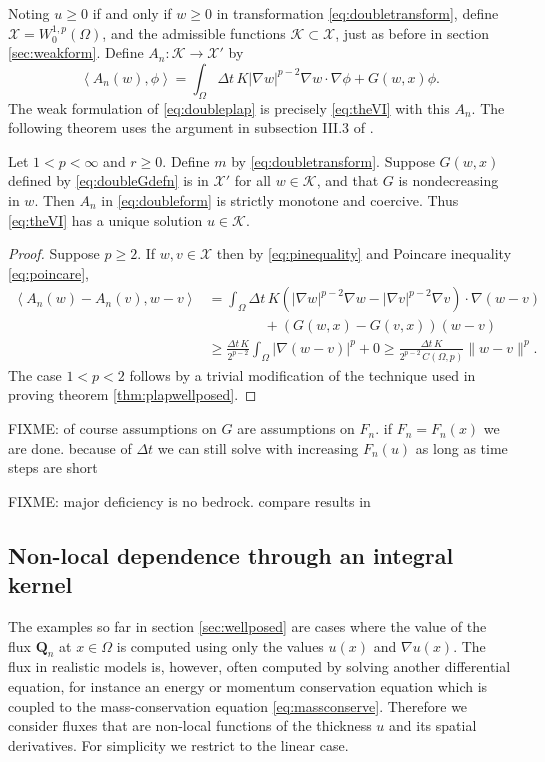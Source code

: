 \documentclass[final,leqno,onefignum,onetabnum]{siamltex1213bueler}
\newcommand\bQ{\mathbf{Q}}
\renewcommand{\grad}{\nabla}
\newcommand{\ip}[2]{\ensuremath{\left<#1,#2\right>}}
\begin{document}
Noting $u\ge 0$ if and only if $w\ge 0$ in transformation \eqref{eq:doubletransform}, define $\mathcal{X} = W_0^{1,p}(\Omega)$, and the admissible functions $\mathcal{K}\subset \mathcal{X}$, just as before in section \ref{sec:weakform}.  Define $A_n: \mathcal{K} \to \mathcal{X}'$ by
\begin{equation}
\ip{A_n(w)}{\phi} = \int_\Omega \Delta t\, K |\grad w|^{p-2} \grad w\cdot \grad \phi + G(w,x)\phi. \label{eq:doubleform}
\end{equation}
The weak formulation of \eqref{eq:doubleplap} is precisely \eqref{eq:theVI} with this $A_n$.  The following theorem uses the argument in subsection III.3 of \cite{KinderlehrerStampacchia1980}.

\medskip
\begin{theorem}
Let $1<p<\infty$ and $r\ge 0$.  Define $m$ by \eqref{eq:doubletransform}.  Suppose $G(w,x)$ defined by \eqref{eq:doubleGdefn} is in $\mathcal{X}'$ for all $w\in\mathcal{K}$, and that $G$ is nondecreasing in $w$.  Then $A_n$ in \eqref{eq:doubleform} is strictly monotone and coercive.  Thus \eqref{eq:theVI} has a unique solution $u\in\mathcal{K}$.
\end{theorem}

\begin{proof}
Suppose $p\ge 2$.  If $w,v\in\mathcal{X}$ then by \eqref{eq:pinequality} and Poincare inequality \eqref{eq:poincare},
\begin{align*}
\ip{A_n(w)-A_n(v)}{w-v} &= \int_\Omega \Delta t\, K \left(|\grad w|^{p-2} \grad w - |\grad v|^{p-2} \grad v\right) \cdot \grad (w-v) \\
  &\qquad\qquad + \left(G(w,x) - G(v,x)\right) (w-v) \\
  &\ge \frac{\Delta t\,K}{2^{p-2}} \int_\Omega |\grad (w-v)|^p + 0 \ge \frac{\Delta t\,K}{2^{p-2}\, C(\Omega,p)} \|w-v\|^p.
\end{align*}
The case $1<p<2$ follows by a trivial modification of the technique used in proving theorem \ref{thm:plapwellposed}.
\end{proof}

FIXME: of course assumptions on $G$ are assumptions on $F_n$.  if $F_n=F_n(x)$ we are done. because of $\Delta t$ we can still solve with increasing $F_n(u)$ as long as time steps are short

FIXME: major deficiency is no bedrock. compare results in \cite{JouvetBueler2012}


\subsection{Non-local dependence through an integral kernel} \label{subsec:nonlocal}   The examples so far in section \ref{sec:wellposed} are cases where the value of the flux $\bQ_n$ at $x\in\Omega$ is computed using only the values $u(x)$ and $\grad u(x)$.  The flux in realistic models is, however, often computed by solving another differential equation, for instance an energy or momentum conservation equation which is coupled to the mass-conservation equation \eqref{eq:massconserve}.  Therefore we consider fluxes that are non-local functions of the thickness $u$ and its spatial derivatives.  For simplicity we restrict to the linear case.
\end{document}

